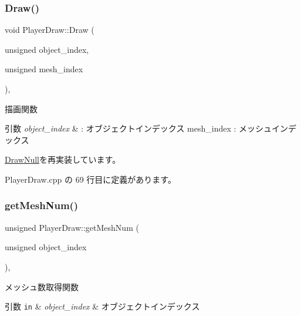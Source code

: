 \subsubsection{\texorpdfstring{Draw()}{Draw()}}
{\footnotesize\ttfamily void Player\+Draw\+::\+Draw (\begin{DoxyParamCaption}\item[{unsigned}]{object\+\_\+index,  }\item[{unsigned}]{mesh\+\_\+index }\end{DoxyParamCaption})\hspace{0.3cm}{\ttfamily [override]}, {\ttfamily [virtual]}}



描画関数 


\begin{DoxyParams}{引数}
{\em object\+\_\+index} & \+: オブジェクトインデックス mesh\+\_\+index \+: メッシュインデックス \\
\hline
\end{DoxyParams}


\mbox{\hyperlink{class_draw_null_a72ac0b7dc40b1469582419dcc5b0e114}{Draw\+Null}}を再実装しています。



 Player\+Draw.\+cpp の 69 行目に定義があります。

\mbox{\label{class_player_draw_ac618153d70492f73299c58a50d565431}} 
\subsubsection{\texorpdfstring{get\+Mesh\+Num()}{getMeshNum()}}
{\footnotesize\ttfamily unsigned Player\+Draw\+::get\+Mesh\+Num (\begin{DoxyParamCaption}\item[{unsigned}]{object\+\_\+index }\end{DoxyParamCaption})\hspace{0.3cm}{\ttfamily [override]}, {\ttfamily [virtual]}}



メッシュ数取得関数 


\begin{DoxyParams}[1]{引数}
\mbox{\tt in}  & {\em object\+\_\+index} & オブジェクトインデックス \\
\hline
\end{DoxyParams}


